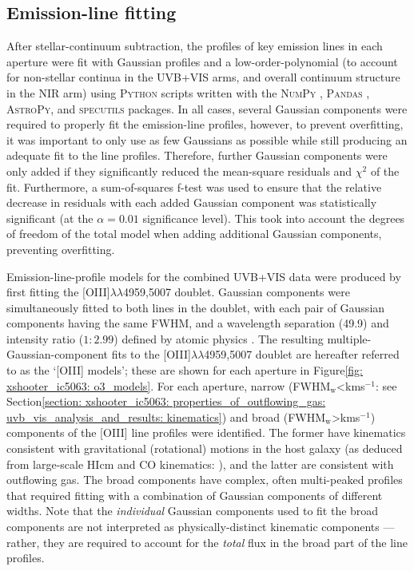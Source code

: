 \subsection{Emission-line fitting}
\label{section: xshooter_ic_5063: observations_and_data_reduction: emission_line_fitting}

After stellar-continuum subtraction, the profiles of key emission lines in each aperture were fit with Gaussian profiles and a low-order-polynomial (to account for non-stellar continua in the UVB+VIS arms, and overall continuum structure in the NIR arm) using \textsc{Python} scripts written with the \textsc{NumPy} \citep{Harris2020}, \textsc{Pandas} \citep{reback2020pandas}, \textsc{AstroPy}, and \textsc{specutils} packages. In all cases, several Gaussian components were required to properly fit the emission-line profiles, however, to prevent overfitting, it was important to only use as few Gaussians as possible while still producing an adequate fit to the line profiles. Therefore, further Gaussian components were only added if they significantly reduced the mean-square residuals and $\chi^2$ of the fit. Furthermore, a sum-of-squares f-test \citep{Montgomery2012} was used to ensure that the relative decrease in residuals with each added Gaussian component was statistically significant (at the $\alpha=0.01$ significance level). This took into account the degrees of freedom of the total model when adding additional Gaussian components, preventing overfitting.

Emission-line-profile models for the combined UVB+VIS data were produced by first fitting the [OIII]$\lambda\lambda$4959,5007 doublet. Gaussian components were simultaneously fitted to both lines in the doublet, with each pair of Gaussian components having the same FWHM, and a wavelength separation (49.9\;{\AA}) and intensity ratio ($1:2.99$) defined by atomic physics \citep{Osterbrock2006}. The resulting multiple-Gaussian-component fits to the [OIII]$\lambda\lambda$4959,5007 doublet are hereafter referred to as the `[OIII] models'; these are shown for each aperture in Figure\;\ref{fig: xshooter_ic5063: o3_models}. For each aperture, narrow (FWHM$_\mathrm{w}$\;\textless{}\;km\;s$^{-1}$: see Section\;\ref{section: xshooter_ic5063: properties_of_outflowing_gas: uvb_vis_analysis_and_results: kinematics}) and broad (FWHM$_\mathrm{w}$\;\textgreater{}\;km\;s$^{-1}$) components of the [OIII] line profiles were identified. The former have kinematics consistent with gravitational (rotational) motions in the host galaxy (as deduced from large-scale HI\;cm and CO kinematics: \citealt{Morganti1998, Morganti2015}), and the latter are consistent with outflowing gas. The broad components have complex, often multi-peaked profiles that required fitting with a combination of Gaussian components of different widths. Note that the \textit{individual} Gaussian components used to fit the broad components are not interpreted as physically-distinct kinematic components --- rather, they are required to account for the \textit{total} flux in the broad part of the line profiles.

